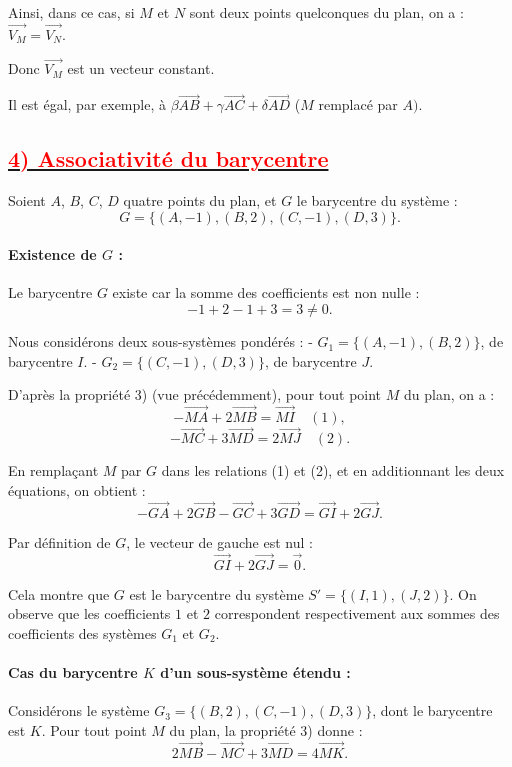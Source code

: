 \documentclass{article}
\begin{document}
Ainsi, dans ce cas, si $M$ et $N$ sont deux points quelconques du plan, on a : $\overrightarrow{V_{M}}=\overrightarrow{V_{N}}.$

Donc $\overrightarrow{V_{M}}$ est un vecteur constant.

Il est égal, par exemple, à $\beta\overrightarrow{AB}+\gamma\overrightarrow{AC}+\delta\overrightarrow{AD}$ ($M$ remplacé par $A).$
\subsection*{\underline{\textbf{\textcolor{red}{4) Associativité du barycentre}}}}

Soient \( A \), \( B \), \( C \), \( D \) quatre points du plan, et \( G \) le barycentre du système :  
\[
G = \{(A, -1), (B, 2), (C, -1), (D, 3)\}.
\]

\paragraph{Existence de \( G \) :}  
Le barycentre \( G \) existe car la somme des coefficients est non nulle :  
\[
-1 + 2 - 1 + 3 = 3 \neq 0.
\]

Nous considérons deux sous-systèmes pondérés :  
- \( G_1 = \{(A, -1), (B, 2)\} \), de barycentre \( I \).  
- \( G_2 = \{(C, -1), (D, 3)\} \), de barycentre \( J \).

D’après la propriété 3) (vue précédemment), pour tout point \( M \) du plan, on a :  
\[
-\overrightarrow{MA} + 2\overrightarrow{MB} = \overrightarrow{MI} \quad (1),
\]
\[
-\overrightarrow{MC} + 3\overrightarrow{MD} = 2\overrightarrow{MJ} \quad (2).
\]

En remplaçant \( M \) par \( G \) dans les relations (1) et (2), et en additionnant les deux équations, on obtient :  
\[
-\overrightarrow{GA} + 2\overrightarrow{GB} - \overrightarrow{GC} + 3\overrightarrow{GD} = \overrightarrow{GI} + 2\overrightarrow{GJ}.
\]

Par définition de \( G \), le vecteur de gauche est nul :  
\[
\overrightarrow{GI} + 2\overrightarrow{GJ} = \vec{0}.
\]

Cela montre que \( G \) est le barycentre du système \( S' = \{(I, 1), (J, 2)\} \).  
On observe que les coefficients \( 1 \) et \( 2 \) correspondent respectivement aux sommes des coefficients des systèmes \( G_1 \) et \( G_2 \).

\paragraph{Cas du barycentre \( K \) d’un sous-système étendu :}  
Considérons le système \( G_3 = \{(B, 2), (C, -1), (D, 3)\} \), dont le barycentre est \( K \).  
Pour tout point \( M \) du plan, la propriété 3) donne :  
\[
2\overrightarrow{MB} - \overrightarrow{MC} + 3\overrightarrow{MD} = 4\overrightarrow{MK}.
\]
\end{document}
